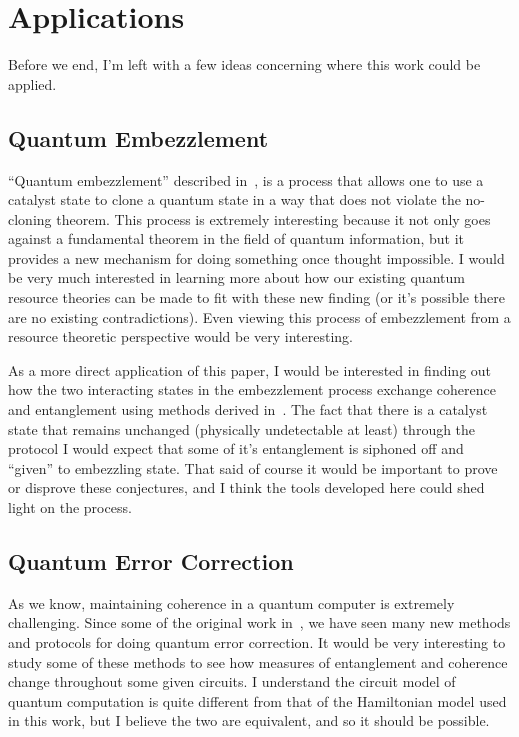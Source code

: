 \documentclass[11pt,english]{article}
\theoremstyle{definition}
\begin{document}
\section{Applications}

Before we end, I'm left with a few ideas concerning where this work could be applied.

\subsection{Quantum Embezzlement}
``Quantum embezzlement'' described in~\cite{embezzlement,self-embezzlement}, is a process that allows one to use a catalyst state to clone a quantum state in a way that does not violate the no-cloning theorem. This process is extremely interesting because it not only goes against a fundamental theorem in the field of quantum information, but it provides a new mechanism for doing something once thought impossible. I would be very much interested in learning more about how our existing quantum resource theories can be made to fit with these new finding (or it's possible there are no existing contradictions). Even viewing this process of embezzlement from a resource theoretic perspective would be very interesting.

As a more direct application of this paper, I would be interested in finding out how the two interacting states in the embezzlement process exchange coherence and entanglement using methods derived in~\cite{dynamic-entropies}. The fact that there is a catalyst state that remains unchanged (physically undetectable at least) through the protocol I would expect that some of it's entanglement is siphoned off and ``given'' to embezzling state. That said of course it would be important to prove or disprove these conjectures, and I think the tools developed here could shed light on the process.

\subsection{Quantum Error Correction}
As we know, maintaining coherence in a quantum computer is extremely challenging. Since some of the original work in~\cite{error-correction}, we have seen many new methods and protocols for doing quantum error correction. It would be very interesting to study some of these methods to see how measures of entanglement and coherence change throughout some given circuits. I understand the circuit model of quantum computation is quite different from that of the Hamiltonian model used in this work, but I believe the two are equivalent, and so it should be possible.

\clearpage


\end{document}
